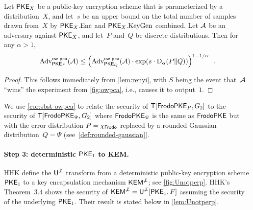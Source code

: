\documentclass{iacrcc}
\begin{document}
\begin{corollary}
  \label{cor:sbst-owpca}
  Let $\textsf{\upshape\mdseries PKE}_X$ be a public-key encryption scheme that is parameterized
  by a distribution~$X$, and let~$s$ be an upper bound on the total
  number of samples drawn from~$X$ by $\textsf{\upshape\mdseries PKE}_X.\textrm{\upshape\mdseries Enc}$ and
  $\textsf{\upshape\mdseries PKE}_X.\textrm{\upshape\mdseries KeyGen}$ combined. Let $\mathcal{A}$ be an \OWPCA adversary
  against $\textsf{\upshape\mdseries PKE}_X$, and let~$P$ and~$Q$ be discrete
  distributions. Then for any $\alpha > 1$,
  \[
    \mathrm{Adv}^{\textsf{\upshape\mdseries \textsf{\upshape\mdseries ow-pca}}}_{\textsf{\upshape\mdseries PKE}_P}(\mathcal{A}) \leq
    \left( \mathrm{Adv}^{\textsf{\upshape\mdseries \textsf{\upshape\mdseries ow-pca}}}_{\textsf{\upshape\mdseries PKE}_Q}(\mathcal{A})\cdot
      \exp(s \cdot \mathrm{D}_\alpha(P \| Q)) \right)^{1-1/\alpha} \enspace .
  \]
\end{corollary}

\begin{proof}
  This follows immediately from \autoref{lem:renyi}, with $S$ being
  the event that~$\mathcal{A}$ ``wins'' the \OWPCA experiment from
  \autoref{fig:owpca}, i.e., causes it to output~$1$.
\end{proof}

We use \autoref{cor:sbst-owpca} to relate the \OWPCA security of
$\textsf{\upshape\mdseries T}[\textsf{\upshape\mdseries FrodoPKE}_{P},G_{2}]$ to the \OWPCA security of
$\textsf{\upshape\mdseries T}[\textsf{\upshape\mdseries FrodoPKE}_\Psi,G_{2}]$ where $\textsf{\upshape\mdseries FrodoPKE}_\Psi$ is the same as
$\textsf{\upshape\mdseries FrodoPKE}$ but with the error distribution $P=\chi_{\textsf{\upshape\mdseries Frodo}}$ replaced
by a rounded Gaussian distribution~$Q=\Psi$
(see~\autoref{def:rounded-gaussian}).

\paragraph{Step 3: \OWPCA deterministic $\textsf{\upshape\mdseries PKE}_1$ to \INDCCA KEM.}

HHK define the $\textsf{\upshape\mdseries U}^{\not\perp}$ transform from a deterministic public-key
encryption scheme $\textsf{\upshape\mdseries PKE}_1$ to a key encapsulation mechanism
$\textsf{\upshape\mdseries KEM}^{\not\perp}$; see \autoref{fig:Unotperp}.  HHK's Theorem~3.4 shows
the \INDCCA security of $\textsf{\upshape\mdseries KEM}^{\not\perp} = \textsf{\upshape\mdseries U}^{\not\perp}[\textsf{\upshape\mdseries PKE}_1,F]$ assuming
the \OWPCA security of the underlying $\textsf{\upshape\mdseries PKE}_1$. Their result is
stated below in \autoref{lem:Unotperp}.
\end{document}
